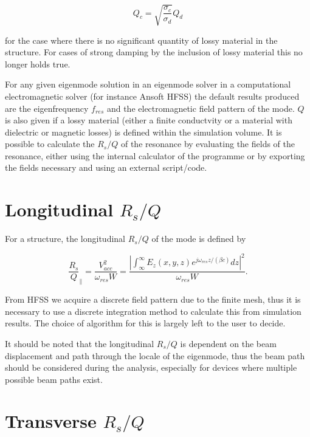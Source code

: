 \begin{equation}
Q_{c} = \sqrt{\frac{\sigma_{c}}{\sigma_{d}}}Q_{d}
\end{equation}

for the case where there is no significant quantity of lossy material in the structure. For cases of strong damping by the inclusion of lossy material this no longer holds true.

For any given eigenmode solution in an eigenmode solver in a computational electromagnetic solver (for instance Ansoft HFSS) the default results produced are the eigenfrequency $f_{res}$ and the electromagnetic field pattern of the mode. $Q$ is also given if a lossy material (either a finite conductvity or a material with dielectric or magnetic losses)  is defined within the simulation volume. It is possible to calculate the $R_{s}/Q$ of the resonance by evaluating the fields of the resonance, either using the internal calculator of the programme or by exporting the fields necessary and using an external script/code.

\section{Longitudinal $R_{s}/Q$}

For a structure, the longitudinal $R_{s}/Q$ of the mode is defined by

\begin{equation}
\frac{R_{s}}{Q}_{\parallel} = \frac{V_{acc}^{2}}{\omega_{res} W} = \frac{\left| \int^{\infty}_{\infty} E_{z} \left( x,y,z \right) e^{j \omega_{res}z/\left( \beta c \right)} dz \right|^{2}}{\omega_{res} W}. 
\end{equation}

From HFSS we acquire a discrete field pattern due to the finite mesh, thus it is necessary to use a discrete integration method to calculate this from simulation results. The choice of algorithm for this is largely left to the user to decide.

It should be noted that the longitudinal $R_{s}/Q$ is dependent on the beam displacement and path through the locale of the eigenmode, thus the beam path should be considered during the analysis, especially for devices where multiple possible beam paths exist.

\section{Transverse $R_{s}/Q$}

